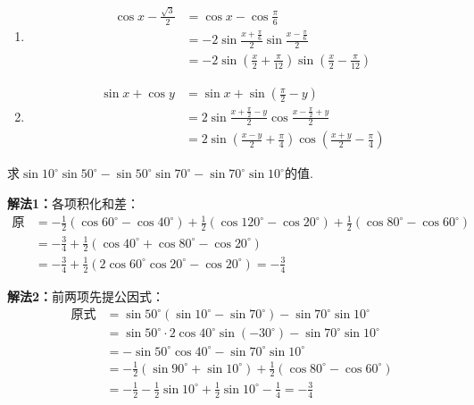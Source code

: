 \begin{solution}
\begin{enumerate}[(1)]
    \item 
\begin{align}
    \cos x-\frac{\sqrt{3}}{2}&=\cos x-\cos\frac{\pi}{6}\tag{先变为同名函数}\\
    &=-2\sin\frac{x+\frac{\pi}{6}}{2}\sin\frac{x-\frac{\pi}{6}}{2}\nonumber\\
    &=-2\sin\left(\frac{x}{2}+\frac{\pi}{12}\right)\sin\left(\frac{x}{2}-\frac{\pi}{12}\right)\nonumber
\end{align}

\item \begin{align}
    \sin x+\cos y&=\sin x+\sin\left(\frac{\pi}{2}-y\right) \tag{先变为同名函数}\\
    &=2\sin\frac{x+\frac{\pi}{2}-y}{2}\cos\frac{x-\frac{\pi}{2}+y}{2}\nonumber\\
    &=2\sin\left(\frac{x-y}{2}+\frac{\pi}{4}\right)\cos\left(\frac{x+y}{2}-\frac{\pi}{4}\right)\nonumber
\end{align}
\end{enumerate}    
\end{solution}

\begin{example}
求$\sin10^{\circ}\sin50^{\circ}-\sin50^{\circ}\sin70^{\circ}-\sin70^{\circ}\sin10^{\circ}$的值.
\end{example}

\begin{solution}
\textbf{解法1：}各项积化和差：
\[\begin{split}
\text{原式}&=-\frac{1}{2}(\cos60^{\circ}-\cos40^{\circ})+\frac{1}{2}(\cos120^{\circ}-\cos20^{\circ})+\frac{1}{2}(\cos80^{\circ}-\cos60^{\circ})\\
&=-\frac{3}{4}+\frac{1}{2}(\cos40^{\circ}+\cos80^{\circ}-\cos20^{\circ})\\
&=-\frac{3}{4}+\frac{1}{2}(2\cos60^{\circ}\cos20^{\circ}-\cos20^{\circ})=-\frac{3}{4}
\end{split}\]

\textbf{解法2：}前两项先提公因式：
\[\begin{split}
\text{原式}&=\sin50^{\circ} (\sin10^{\circ} -\sin70^{\circ} )-\sin70^{\circ} \sin10^{\circ} \\
&=\sin50^{\circ} \cdot 2\cos40^{\circ} \sin(-30^{\circ} )-\sin70^{\circ} \sin10^{\circ}\\
&=-\sin50^{\circ} \cos40^{\circ} -\sin70^{\circ} \sin10^{\circ} \\
&=-\frac{1}{2}(\sin90^{\circ}+\sin10^{\circ})+\frac{1}{2}(\cos80^{\circ}-\cos60^{\circ})\\
&=-\frac{1}{2}-\frac{1}{2}\sin10^{\circ}+\frac{1}{2}\sin10^{\circ}-\frac{1}{4}=-\frac{3}{4}
\end{split}\]
\end{solution}

